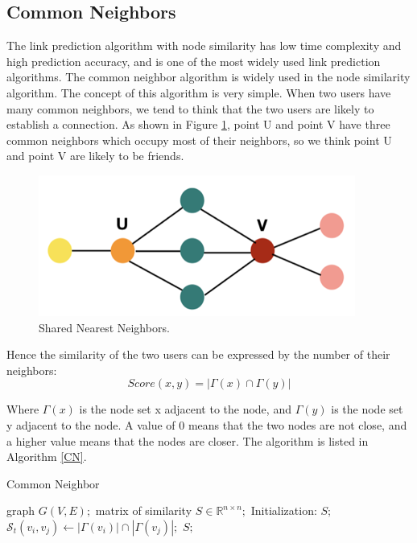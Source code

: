 \documentclass{article}
\begin{document}
\subsection{Common Neighbors}
The link prediction algorithm with node similarity has low time complexity and high prediction accuracy, and is one of the most widely used link prediction algorithms. The common neighbor algorithm is widely used in the node similarity algorithm. The concept of this algorithm is very simple. When two users have many common neighbors, we tend to think that the two users are likely to establish a connection. As shown in Figure \ref{CN_NW}, point U and point V have three common neighbors which occupy most of their neighbors, so we think point U and point V are likely to be friends.

\begin{figure}[h!]
	\includegraphics{images/nearest.png}
	\centering
	\caption{Shared Nearest Neighbors.}	\label{CN_NW}
\end{figure}

Hence the similarity of the two users can be expressed by the number of their neighbors:\\
\begin{equation}
Score(x,y) = |\Gamma (x) \cap \Gamma (y)|
\end{equation}


Where $\Gamma(x)$ is the node set x adjacent to the node, and $\Gamma(y)$ is the node set y adjacent to the node. A value of 0 means that the two nodes are not close, and a higher value means that the nodes are closer.  The algorithm is listed in Algorithm \ref{CN}.\\

\begin{algorithm}[htb] 
	\caption{Common Neighbor} 
	\label{CN} 
	\begin{algorithmic}
		\REQUIRE  	graph $G(V,E);$
		\ENSURE  matrix of similarity $S \in \mathbb{R}^{n \times n};$
		\STATE Initialization: $S;$ 
		\STATE$\mathcal{S}_t(v_i,v_j) \gets  | \Gamma(v_i) |  \cap  | \Gamma(v_j) |;$
		\ENDFOR
		\ENDFOR
		\RETURN $S;$
	\end{algorithmic}
\end{algorithm}
\end{document}
